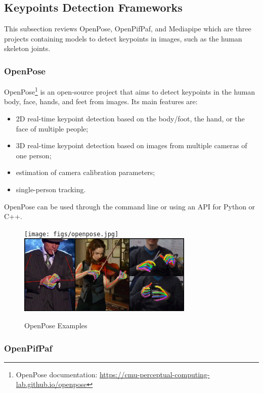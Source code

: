 \subsection{Keypoints Detection Frameworks}
\label{subsection:keypointdetection}

This subsection reviews OpenPose, OpenPifPaf, and Mediapipe which are three projects containing models to detect keypoints in images, such as the human skeleton joints.

\subsubsection{OpenPose}

OpenPose\cite{Cao2021,Simon2017,Cao2018,Wei2016}\footnote{OpenPose documentation: \url{https://cmu-perceptual-computing-lab.github.io/openpose}} is an open-source project that aims to detect keypoints in the human body, face, hands, and feet from images. Its main features are:
\begin{itemize}
    \item 2D real-time keypoint detection based on the body/foot, the hand, or the face of multiple people;
    \item 3D real-time keypoint detection based on images from multiple cameras of one person;
    \item estimation of camera calibration parameters;
    \item single-person tracking.
\end{itemize}

OpenPose can be used through the command line or using an API for Python or C++.

\begin{figure}[ht]
    \centerline{\texttt{[image: figs/openpose.jpg]} \includegraphics[height=1.5in]{figs/openpose2.jpg}}
    \caption[OpenPose Examples]{OpenPose Examples \cite{Cao2021,Simon2017}}
    \label{fig:openpose}
\end{figure}

\subsubsection{OpenPifPaf}

